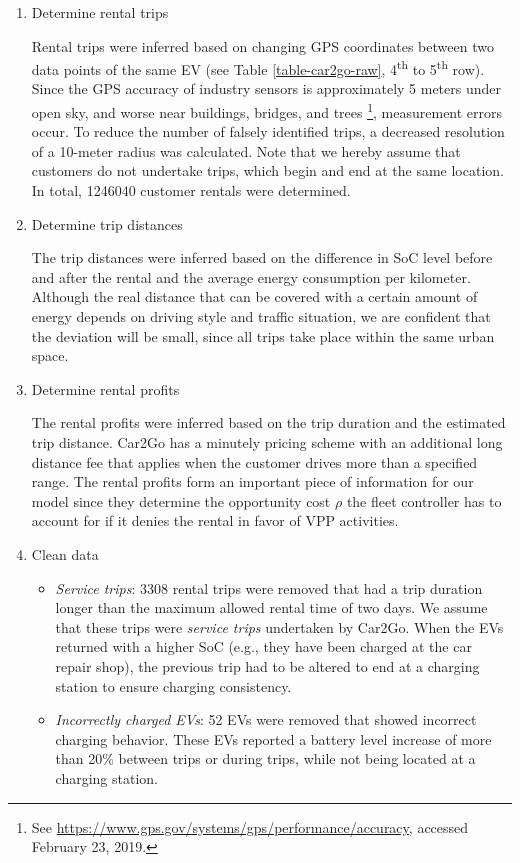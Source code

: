\documentclass[a4paper, 12pt]{article}
\begin{document}
\begin{enumerate}
\item Determine rental trips

Rental trips were inferred based on changing GPS coordinates between two data
points of the same EV (see Table \ref{table-car2go-raw}, 4\textsuperscript{th} to 5\textsuperscript{th} row).
Since the GPS accuracy of industry sensors is approximately 5 meters under
open sky, and worse near buildings, bridges, and trees \footnote{See \url{https://www.gps.gov/systems/gps/performance/accuracy}, accessed
February 23, 2019.}, measurement
errors occur. To reduce the number of falsely identified trips, a decreased
resolution of a 10-meter radius was calculated. Note that we hereby assume
that customers do not undertake trips, which begin and end at the same
location. In total, 1246040 customer rentals were determined.

\item Determine trip distances

The trip distances were inferred based on the difference in SoC level before
and after the rental and the average energy consumption per kilometer.
Although the real distance that can be covered with a certain amount of
energy depends on driving style and traffic situation, we are confident that
the deviation will be small, since all trips take place within the same urban
space.

\item Determine rental profits

The rental profits were inferred based on the trip duration and the estimated
trip distance. Car2Go has a minutely pricing scheme with an additional long
distance fee that applies when the customer drives more than a specified
range. The rental profits form an important piece of information for our
model since they determine the opportunity cost \(\rho\) the fleet controller
has to account for if it denies the rental in favor of VPP activities.

\item Clean data
\begin{itemize}
\item \emph{Service trips}: 3308 rental trips were removed that had a trip duration
longer than the maximum allowed rental time of two days. We assume that
these trips were \emph{service trips} undertaken by Car2Go. When the EVs
returned with a higher SoC (e.g., they have been charged at the car repair
shop), the previous trip had to be altered to end at a charging station to
ensure charging consistency.
\item \emph{Incorrectly charged EVs}: 52 EVs were removed that showed incorrect
charging behavior. These EVs reported a battery level increase of more than 20\%
between trips or during trips, while not being located at a charging station.
\end{itemize}
\end{enumerate}
\end{document}
